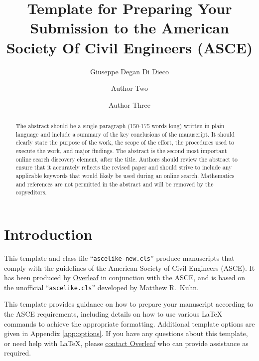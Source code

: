 \documentclass[Journal,letterpaper]{ascelike-new}
\begin{document}
\title{Template for Preparing Your Submission to the American Society Of Civil Engineers (ASCE)}

\author[1]{Giuseppe Degan Di Dieco}
\author[2]{Author Two}
\author[3]{Author Three}


\maketitle

\begin{abstract}
The abstract should be a single paragraph (150-175 words long) written in plain language and include a summary of the key conclusions of the manuscript. It should clearly state the purpose of the work, the scope of the effort, the procedures used to execute the work, and major findings. The abstract is the second most important online search discovery element, after the title. Authors should review the abstract to ensure that it accurately reflects the revised paper and should strive to include any applicable keywords that would likely be used during an online search. Mathematics and references are not permitted in the abstract and will be removed by the copyeditors.
\end{abstract}

\section{Introduction}
This template and class file ``\texttt{ascelike-new.cls}'' produce manuscripts that comply with the guidelines of the American Society of Civil Engineers (ASCE). It has been produced by \href{https://www.overleaf.com}{Overleaf} in conjunction with the ASCE, and is based on the unofficial ``\texttt{ascelike.cls}'' developed by Matthew R.~Kuhn.

This template provides guidance on how to prepare your manuscript according to the ASCE requirements, including details on how to use various LaTeX commands to achieve the appropriate formatting. Additional template options are given in Appendix \ref{app:options}. If you have any questions about this template, or need help with LaTeX, please \href{https://www.overleaf.com/contact}{contact Overleaf} who can provide assistance as required.
\end{document}

